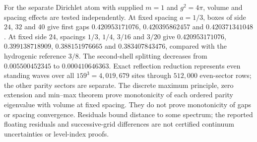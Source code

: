 For the separate Dirichlet atom with supplied $m=1$ and $g^2=4\pi$,
volume and spacing effects are tested independently. At fixed spacing
$a=1/3$, boxes of side $24$, $32$ and $40$ give first gaps
$0.420953171076$, $0.420395862457$ and $0.420371341048$.
At fixed side $24$, spacings $1/3$, $1/4$, $3/16$ and $3/20$
give $0.420953171076$, $0.399138718909$, $0.388151976665$ and
$0.383407843476$, compared with the hydrogenic reference $3/8$.
The second-shell splitting decreases from $0.005500452345$ to
$0.000410646363$. Exact reflection reduction represents even standing
waves over all $159^3=4{,}019{,}679$ sites through $512{,}000$
even-sector rows; the other parity sectors are separate.
The discrete maximum principle, zero extension and min--max theorem
prove monotonicity of each ordered parity eigenvalue with volume at
fixed spacing. They do not prove monotonicity of gaps or spacing
convergence. Residuals bound distance to some spectrum; the reported
floating residuals and successive-grid differences are not certified
continuum uncertainties or level-index proofs.
